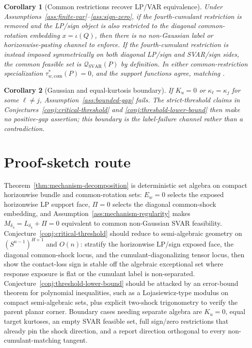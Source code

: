 \documentclass[11pt]{article}
\theoremstyle{definition}
\theoremstyle{plain}
\newtheorem{corollary}{Corollary}
\theoremstyle{remark}
\begin{document}
\begin{corollary}[Common restrictions recover LP/VAR equivalence]\label{cor:common-restrictions}
Under Assumptions~\ref{ass:finite-var}--\ref{ass:sign-zero}, if the fourth-cumulant restriction is removed and the LP/sign object is also restricted to the diagonal common-rotation embedding \(x=\iota(Q)\), then there is no non-Gaussian label or horizonwise-pasting channel to enforce.  If the fourth-cumulant restriction is instead imposed symmetrically on both diagonal LP/sign and SVAR/sign sides, the common feasible set is \(\mathcal Q_{\mathrm{SVAR}}(P)\) by definition.  In either common-restriction specialization \(\tau_{w,\mathrm{com}}^*(P)=0\), and the support functions agree, matching \citet{PlagborgMollerWolf2021}.
\end{corollary}

\begin{corollary}[Gaussian and equal-kurtosis boundary]\label{cor:gaussian-boundary}
If \(K_u=0\) or \(\kappa_\ell=\kappa_j\) for some \(\ell\ne j\), Assumption~\ref{ass:bounded-gap} fails.  The strict-threshold claims in Conjectures~\ref{conj:critical-threshold} and \ref{conj:threshold-lower-bound} then make no positive-gap assertion; this boundary is the label-failure channel rather than a contradiction.
\end{corollary}

\section{Proof-sketch route}
Theorem~\ref{thm:mechanism-decomposition} is deterministic set algebra on compact horizonwise bundle and common-rotation sets: \(E_w=0\) selects the exposed horizonwise LP support face, \(\Pi=0\) selects the diagonal common-shock embedding, and Assumption~\ref{ass:mechanism-regularity} makes \(M_{\delta_4}=L_{\delta_4}+\Pi=0\) equivalent to common non-Gaussian SVAR feasibility.  Conjecture~\ref{conj:critical-threshold} should reduce to semi-algebraic geometry on \((S^{n-1})^{H+1}\) and \(O(n)\): stratify the horizonwise LP/sign exposed face, the diagonal common-shock locus, and the cumulant-diagonalizing tensor locus, then show the contact-loss sign is stable off the algebraic exceptional set where response exposure is flat or the cumulant label is non-separated.  Conjecture~\ref{conj:threshold-lower-bound} should be attacked by an error-bound theorem for polynomial inequalities, such as a Lojasiewicz-type modulus on compact semi-algebraic sets, plus explicit two-shock trigonometry to verify the parent planar corner.  Boundary cases needing separate algebra are \(K_u=0\), equal target kurtoses, an empty SVAR feasible set, full sign/zero restrictions that already pin the shock direction, and a report direction orthogonal to every non-cumulant-matching tangent.
\end{document}
